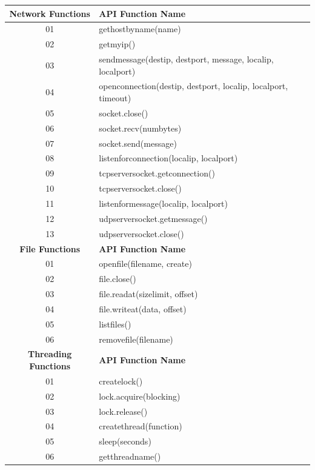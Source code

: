 \begin{table}
\centering
\scriptsize
\begin{tabular}{|c|l|}
  \hline
  \textbf{Network Functions} & \textbf{API Function Name} \\
  \hline
  01 & gethostbyname(name) \\
  \hline
  02 & getmyip() \\
  \hline
  03 & sendmessage(destip, destport, message, localip, localport) \\
  \hline
  04 & openconnection(destip, destport, localip, localport, timeout) \\
  \hline
  05 & socket.close() \\
  \hline
  06 & socket.recv(numbytes) \\
  \hline
  07 & socket.send(message) \\
  \hline
  08 & listenforconnection(localip, localport) \\
  \hline
  09 & tcpserversocket.getconnection() \\
  \hline
  10 & tcpserversocket.close()\\
  \hline
  11 & listenformessage(localip, localport) \\
  \hline
  12 & udpserversocket.getmessage() \\
  \hline
  13 & udpserversocket.close() \\
  \hline \hline
  \textbf{File Functions} & \textbf{API Function Name} \\
  \hline
  01 & openfile(filename, create) \\
  \hline
  02 & file.close() \\
  \hline
  03 & file.readat(sizelimit, offset) \\
  \hline
  04 & file.writeat(data, offset) \\
  \hline
  05 & listfiles() \\
  \hline
  06 & removefile(filename) \\
  \hline \hline
  \textbf{Threading Functions} & \textbf{API Function Name} \\
  \hline
  01 & createlock() \\
  \hline
  02 & lock.acquire(blocking) \\
  \hline
  03 & lock.release() \\
  \hline
  04 & createthread(function) \\
  \hline
  05 & sleep(seconds) \\
  \hline
  06 & getthreadname() \\
  \hline \hline

\end{tabular}
\end{table}
